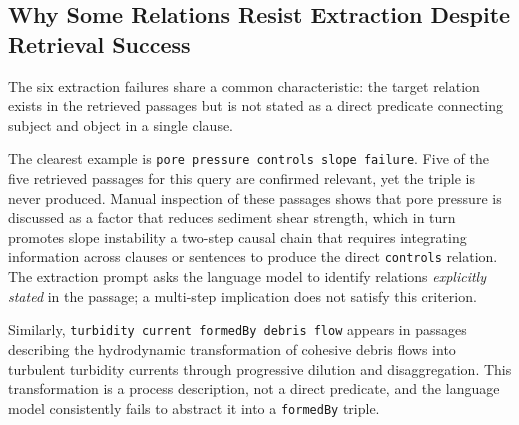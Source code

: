 \documentclass[10pt]{article}
\newcommand{\pred}[1]{\texttt{\small #1}}
\begin{document}
\subsection{Why Some Relations Resist Extraction
Despite Retrieval Success}

The six extraction failures share a common
characteristic: the target relation exists in the
retrieved passages but is not stated as a direct
predicate connecting subject and object in a single
clause.

The clearest example is \pred{pore pressure controls
slope failure}.
Five of the five retrieved passages for this query
are confirmed relevant, yet the triple is never
produced.
Manual inspection of these passages shows that pore
pressure is discussed as a factor that reduces
sediment shear strength, which in turn promotes
slope instability  a two-step causal chain that
requires integrating information across clauses or
sentences to produce the direct \pred{controls}
relation.
The extraction prompt asks the language model to
identify relations \emph{explicitly stated} in the
passage; a multi-step implication does not satisfy
this criterion.

Similarly, \pred{turbidity current formedBy debris
flow} appears in passages describing the
hydrodynamic transformation of cohesive debris
flows into turbulent turbidity currents through
progressive dilution and disaggregation.
This transformation is a process description, not
a direct predicate, and the language model
consistently fails to abstract it into a
\pred{formedBy} triple.
\end{document}
